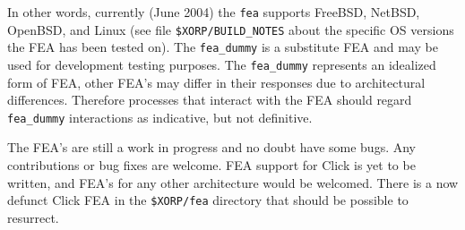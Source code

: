 \documentclass[11pt]{article}
\begin{document}
In other words, currently (June 2004) the {\tt fea} supports FreeBSD,
NetBSD, OpenBSD, and Linux (see file {\tt \$XORP/BUILD\_NOTES}
about the specific OS versions the FEA has been tested on).
The {\tt fea\_dummy} is a substitute FEA and may be
used for development testing purposes.  The {\tt fea\_dummy}
represents an idealized form of FEA, other FEA's may differ in their
responses due to architectural differences.  Therefore processes that
interact with the FEA should regard {\tt fea\_dummy} interactions as
indicative, but not definitive.

The FEA's are still a work in progress and no doubt have some bugs.
Any contributions or bug fixes are welcome. FEA support for Click is
yet to be written, and FEA's for any other architecture would
be welcomed.  There is a now defunct Click FEA in the {\tt \$XORP/fea}
directory that should be possible to resurrect.




\end{document}
